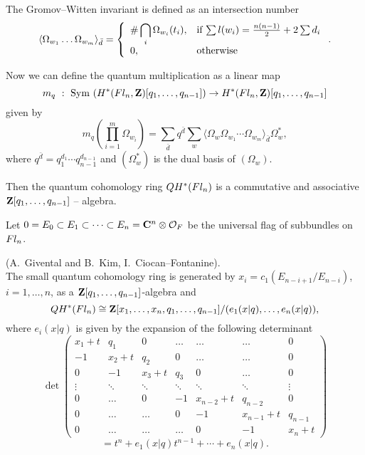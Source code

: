 {{\begin{de} The Gromov--Witten invariant is defined as an intersection 
number
$$\langle\Omega_{w_1}\ldots\Omega_{w_m}\rangle_{\bar d}=\left\{
\begin{array}{ll}\#\displaystyle\bigcap_i\Omega_{w_i}(t_i), & \mbox{{\rm if} 
$\sum l(w_i)=\frac{n(n-1)}{2}+2\sum d_i$}\\ 0, & \mbox{\rm otherwise}
\end{array}\right. .
$$
\end{de}

Now we can define the quantum multiplication as a linear map
$$m_q~:~{\rm Sym~}(H^*(\hbox{$Fl_n$} ,{\bf Z})[q_1,\ldots ,q_{n-1}])\to H^*(\hbox{$Fl_n$} ,{\bf 
Z})[q_1,\ldots ,q_{n-1}]
$$
given by
$$m_q(\prod_{i=1}^m\Omega_{w_i})=\sum_{\bar d}q^{\bar d}
\sum_w\langle\Omega_w\Omega_{w_1}\cdots\Omega_{w_m}\rangle_{\bar d}
\Omega^*_w,
$$
where $q^{\bar d}=q^{d_1}_1\cdots q_{n-1}^{d_{n-1}}$ and $(\Omega^*_w)$ is 
the dual basis of $(\Omega_w)$.

Then the quantum cohomology ring $QH^*(\hbox{$Fl_n$} )$ is a commutative and 
associative ${\bf Z}[q_1,\ldots ,q_{n-1}]$ -- algebra.

Let $0=E_0\subset E_1\subset\cdots\subset E_n={\bf C}^n\otimes{\cal O}_F$
be the universal flag of subbundles on $\hbox{$Fl_n$}$.

\begin{th} \label{106}(A.~Givental and B.~Kim, I.~Ciocan--Fontanine).\\
The small quantum cohomology 
ring is generated by $x_i=c_1(E_{n-i+1}/E_{n-i})$, $i=1,\ldots ,n$, as 
a ${\bf Z}[q_1,\ldots ,q_{n-1}]$-algebra and
$$QH^*(\hbox{$Fl_n$} )\cong{\bf Z}[x_1,\ldots ,x_n,q_1,\ldots 
,q_{n-1}]/(e_1(x|q),\ldots ,e_n(x|q)),
$$
where $e_i(x|q)$ is given by the expansion of the following determinant
$$\det\left(\begin{array}{ccccccc} x_1+t & q_1&0 &\ldots &\ldots 
&\ldots &0\\
-1 & x_2+t & q_2 &0 &\ldots &\ldots & 0\\
0 & -1 &x_3+t & q_3 & 0 &\ldots & 0 \\
\vdots &\ddots &\ddots & \ddots &\ddots &\ddots &\vdots \\
0&\ldots & 0 &-1&x_{n-2}+t &q_{n-2} & 0 \\
0 &\ldots &\ldots & 0 &-1 & x_{n-1}+t & q_{n-1}\\
0 &  \ldots &\ldots &\ldots & 0 & -1 & x_n+t
\end{array}\right) 
$$
$$=t^n+e_1(x|q)t^{n-1}+\cdots +e_n(x|q).
$$
\end{th}

}}
